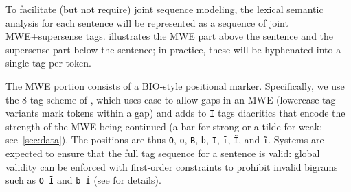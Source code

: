 \documentclass[11pt]{article}
\begin{document}




To facilitate (but not require) joint sequence modeling, 
the lexical semantic analysis for each sentence will be represented as 
a sequence of joint MWE+supersense tags.  illustrates 
the MWE part above the sentence and the supersense part below the sentence; 
in practice, these will be hyphenated into a single tag per token.

The MWE portion consists of a BIO-style \citep{ramshaw-95} 
positional marker. Specifically, we use the 8-tag scheme of \citet{schneider-14}, 
which uses case to allow gaps in an MWE (lowercase tag variants mark 
tokens within a gap) and adds to \texttt{I} tags 
diacritics that encode the strength of the MWE being continued (a bar for strong or a tilde for weak; see~\cref{sec:data}).
The positions are thus \texttt{O}, \texttt{o}, \texttt{B}, \texttt{b},
\texttt{Ī}, \texttt{ī}, \texttt{Ĩ}, and \texttt{ĩ}.
Systems are expected to ensure that the full tag sequence for a sentence is valid: 
global validity can be enforced with first-order constraints 
to prohibit invalid bigrams such as \texttt{O~Ī} and \texttt{b~Ĩ} (see \citealp{schneider-14} for details).
\end{document}
